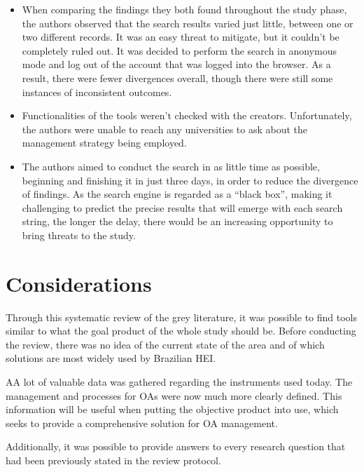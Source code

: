 \begin{itemize}
  \item When comparing the findings they both found throughout the study phase, the authors observed that the search results varied just little, between one or two different records. It was an easy threat to mitigate, but it couldn't be completely ruled out. It was decided to perform the search in anonymous mode and log out of the account that was logged into the browser. As a result, there were fewer divergences overall, though there were still some instances of inconsistent outcomes.
  \item Functionalities of the tools weren't checked with the creators. Unfortunately, the authors were unable to reach any universities to ask about the management strategy being employed.
  \item The authors aimed to conduct the search in as little time as possible, beginning and finishing it in just three days, in order to reduce the divergence of findings. As the search engine is regarded as a ``black box'', making it challenging to predict the precise results that will emerge with each search string, the longer the delay, there would be an increasing opportunity to bring threats to the study.
\end{itemize}

\section{Considerations}\label{sec:gl-considerations}

Through this systematic review of the grey literature, it was possible to find tools similar to what the goal product of the whole study should be. Before conducting the review, there was no idea of the current state of the area and of which solutions are most widely used by Brazilian \ac{HEI}.

AA lot of valuable data was gathered regarding the instruments used today. The management and processes for \aclp{OA} were now much more clearly defined. This information will be useful when putting the objective product into use, which seeks to provide a comprehensive solution for \ac{OA} management.

Additionally, it was possible to provide answers to every research question that had been previously stated in the review protocol.
